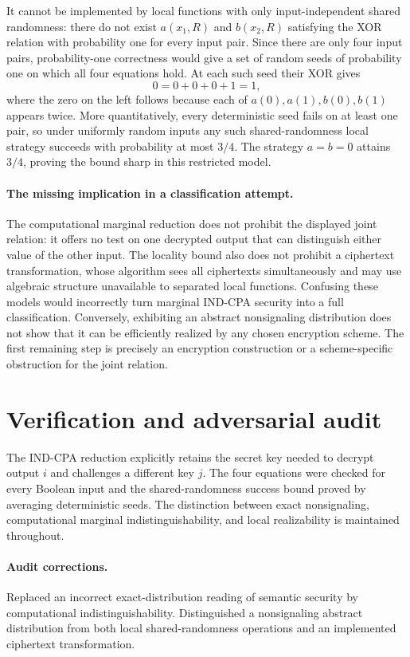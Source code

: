 \documentclass[11pt]{article}
\begin{document}
It cannot be implemented by local functions with only input-independent shared randomness: there do not exist $a(x_1,R)$ and $b(x_2,R)$ satisfying the XOR relation with probability one for every input pair. Since there are only four input pairs, probability-one correctness would give a set of random seeds of probability one on which all four equations hold. At each such seed their XOR gives
\[
 0=0+0+0+1=1,
\]
where the zero on the left follows because each of $a(0),a(1),b(0),b(1)$ appears twice. More quantitatively, every deterministic seed fails on at least one pair, so under uniformly random inputs any such shared-randomness local strategy succeeds with probability at most $3/4$. The strategy $a=b=0$ attains $3/4$, proving the bound sharp in this restricted model.

\paragraph{The missing implication in a classification attempt.}
The computational marginal reduction does not prohibit the displayed joint relation: it offers no test on one decrypted output that can distinguish either value of the other input. The locality bound also does not prohibit a ciphertext transformation, whose algorithm sees all ciphertexts simultaneously and may use algebraic structure unavailable to separated local functions. Confusing these models would incorrectly turn marginal IND-CPA security into a full classification. Conversely, exhibiting an abstract nonsignaling distribution does not show that it can be efficiently realized by any chosen encryption scheme. The first remaining step is precisely an encryption construction or a scheme-specific obstruction for the joint relation.
\section{Verification and adversarial audit}
The IND-CPA reduction explicitly retains the secret key needed to decrypt output $i$ and challenges a different key $j$. The four equations were checked for every Boolean input and the shared-randomness success bound proved by averaging deterministic seeds. The distinction between exact nonsignaling, computational marginal indistinguishability, and local realizability is maintained throughout.
\paragraph{Audit corrections.} Replaced an incorrect exact-distribution reading of semantic security by computational indistinguishability. Distinguished a nonsignaling abstract distribution from both local shared-randomness operations and an implemented ciphertext transformation.
\end{document}
